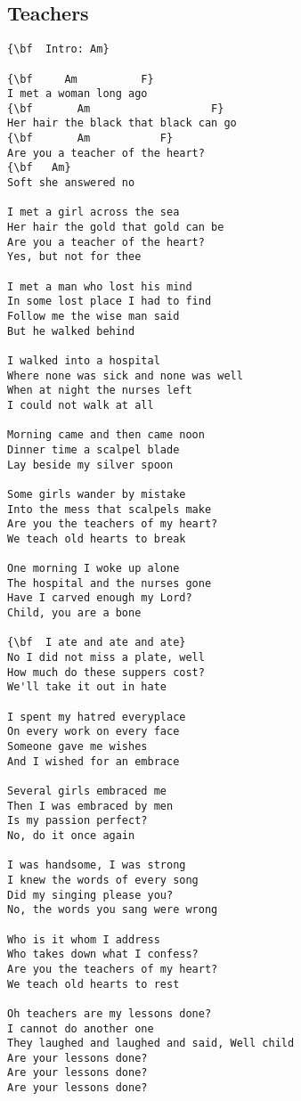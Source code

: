 \documentclass[a4paper]{article}
\begin{document}
\subsection{Teachers}
\begin{multicols}{2}\begin{Verbatim}[commandchars=\\\{\}]
{\bf  Intro: Am}

{\bf     Am          F}
I met a woman long ago
{\bf       Am                   F}
Her hair the black that black can go
{\bf       Am           F}
Are you a teacher of the heart?
{\bf   Am}
Soft she answered no

I met a girl across the sea
Her hair the gold that gold can be
Are you a teacher of the heart?
Yes, but not for thee

I met a man who lost his mind
In some lost place I had to find
Follow me the wise man said
But he walked behind

I walked into a hospital
Where none was sick and none was well
When at night the nurses left
I could not walk at all

Morning came and then came noon
Dinner time a scalpel blade
Lay beside my silver spoon

Some girls wander by mistake
Into the mess that scalpels make
Are you the teachers of my heart?
We teach old hearts to break

One morning I woke up alone
The hospital and the nurses gone
Have I carved enough my Lord?
Child, you are a bone

{\bf  I ate and ate and ate}
No I did not miss a plate, well
How much do these suppers cost?
We'll take it out in hate

I spent my hatred everyplace
On every work on every face
Someone gave me wishes
And I wished for an embrace

Several girls embraced me
Then I was embraced by men
Is my passion perfect?
No, do it once again

I was handsome, I was strong
I knew the words of every song
Did my singing please you?
No, the words you sang were wrong

Who is it whom I address
Who takes down what I confess?
Are you the teachers of my heart?
We teach old hearts to rest

Oh teachers are my lessons done?
I cannot do another one
They laughed and laughed and said, Well child
Are your lessons done?
Are your lessons done?
Are your lessons done?

\end{Verbatim}
\end{multicols}\newpage
\end{document}
